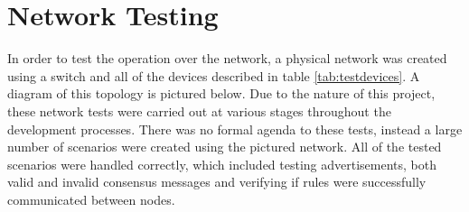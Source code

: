 \documentclass[a4paper, 11pt]{report}
\begin{document}

\section{Network Testing}
In order to test the operation over the network, a physical network was created using a switch and all of the devices described in table \ref{tab:testdevices}. A diagram of this topology is pictured below. Due to the nature of this project, these network tests were carried out at various stages throughout the development processes. There was no formal agenda to these tests, instead a large number of scenarios were created using the pictured network. All of the tested scenarios were handled correctly, which included testing advertisements, both valid and invalid consensus messages and verifying if rules were successfully communicated between nodes.
\end{document}
